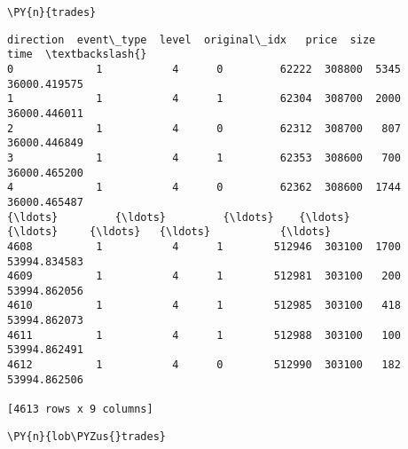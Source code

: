 \documentclass[9pt]{article}
\begin{document}
    \begin{tcolorbox}[breakable, size=fbox, boxrule=1pt, pad at break*=1mm,colback=cellbackground, colframe=cellborder]
\begin{Verbatim}[commandchars=\\\{\}]
\PY{n}{trades}
\end{Verbatim}
\end{tcolorbox}


\begin{scriptsize}
            \begin{tcolorbox}[breakable, size=fbox, boxrule=.5pt, pad at break*=1mm, opacityfill=0]
\begin{Verbatim}[commandchars=\\\{\}]
      direction  event\_type  level  original\_idx   price  size          time  \textbackslash{}
0             1           4      0         62222  308800  5345  36000.419575
1             1           4      1         62304  308700  2000  36000.446011
2             1           4      0         62312  308700   807  36000.446849
3             1           4      1         62353  308600   700  36000.465200
4             1           4      0         62362  308600  1744  36000.465487
{\ldots}         {\ldots}         {\ldots}    {\ldots}           {\ldots}     {\ldots}   {\ldots}           {\ldots}
4608          1           4      1        512946  303100  1700  53994.834583
4609          1           4      1        512981  303100   200  53994.862056
4610          1           4      1        512985  303100   418  53994.862073
4611          1           4      1        512988  303100   100  53994.862491
4612          1           4      0        512990  303100   182  53994.862506

[4613 rows x 9 columns]
\end{Verbatim}
\end{tcolorbox}
\end{scriptsize}
        
    \begin{tcolorbox}[breakable, size=fbox, boxrule=1pt, pad at break*=1mm,colback=cellbackground, colframe=cellborder]
\begin{Verbatim}[commandchars=\\\{\}]
\PY{n}{lob\PYZus{}trades}
\end{Verbatim}
\end{tcolorbox}
\end{document}
